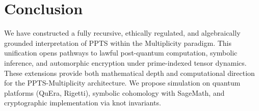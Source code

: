 \documentclass[11pt]{article}
\begin{document}
\section{Conclusion}
We have constructed a fully recursive, ethically regulated, and algebraically grounded interpretation of PPTS within the Multiplicity paradigm. This unification opens pathways to lawful post-quantum computation, symbolic inference, and automorphic encryption under prime-indexed tensor dynamics. These extensions provide both mathematical depth and computational direction for the PPTS-Multiplicity architecture. We propose simulation on quantum platforms (QuEra, Rigetti), symbolic cohomology with SageMath, and cryptographic implementation via knot invariants.
\end{document}
